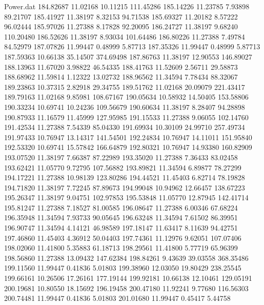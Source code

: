 \begin{filecontents}{Power.dat}
 184.82687   11.02168   10.11215  111.45286
 185.14226   11.23785    7.93898   89.21707
 185.41927   11.38197    8.32153   94.71538
 185.69327   11.20182    8.57222   96.02444
 185.97026   11.27388    8.17828   92.20095
 186.24727   11.38197    9.68240  110.20480
 186.52626   11.38197    8.93034  101.64486
 186.80226   11.27388    7.49784   84.52979
 187.07826   11.99447    0.48999    5.87713
 187.35326   11.99447    0.48999    5.87713
 187.59363   10.66138   35.14507  374.69498
 187.86763   11.38197   12.90553  146.89027
 188.13963   11.67020    3.98822   46.54335
 188.41763   11.52609    2.56711   29.58873
 188.68962   11.59814    1.12322   13.02732
 188.96562   11.34594    7.78434   88.32067
 189.23863   10.37315    2.82918   29.34755
 189.51762   11.02168   20.09079  221.43417
 189.79163   11.02168    9.85981  108.67167
 190.05634   10.58932   14.50405  153.58806
 190.33234   10.69741   10.24236  109.56679
 190.60634   11.38197    8.28407   94.28898
 190.87933   11.16579   11.45999  127.95985
 191.15533   11.27388    9.06055  102.14760
 191.42534   11.27388    7.54339   85.04330
 191.69934   10.30109   24.99710  257.49734
 191.97433   10.76947   13.14317  141.54501
 192.24834   10.76947   14.11011  151.95840
 192.53320   10.69741   15.57842  166.64879
 192.80321   10.76947   14.93380  160.82909
 193.07520   11.38197    7.66387   87.22989
 193.35020   11.27388    7.36433   83.02458
 193.62421   11.05770    9.72795  107.56882
 193.89821   11.34594    6.89877   78.27299
 194.17221   11.27388   10.98139  123.80286
 194.44521   11.45403    6.82714   78.19828
 194.71820   11.38197    7.72245   87.89673
 194.99048   10.94962   12.66457  138.67223
 195.26347   11.38197    9.04751  102.97853
 195.53848   11.05770   12.87945  142.41714
 195.81247   11.27388    7.18527   81.00585
 196.08647   11.27388    6.00346   67.68224
 196.35948   11.34594    7.93733   90.05645
 196.63248   11.34594    7.61502   86.39951
 196.90747   11.34594    4.14121   46.98589
 197.18147   11.63417    8.11639   94.42751
 197.46860   11.45403    4.36912   50.04403
 197.74361   11.12976    9.62051  107.07406
 198.02060   11.41800    5.35883   61.18713
 198.29561   11.41800    5.77719   65.96399
 198.56860   11.27388   13.09432  147.62384
 198.84261    9.43639   39.03558  368.35486
 199.11560   11.99447    0.41836    5.01803
 199.38960   12.03050   19.80429  238.25545
 199.66161   10.26506   17.26161  177.19144
 199.92181   10.66138   12.10461  129.05191
 200.19681   10.80550   18.15692  196.19458
 200.47180   11.92241    9.77680  116.56303
 200.74481   11.99447    0.41836    5.01803
 201.01680   11.99447    0.45417    5.44758

\end{filecontents}

